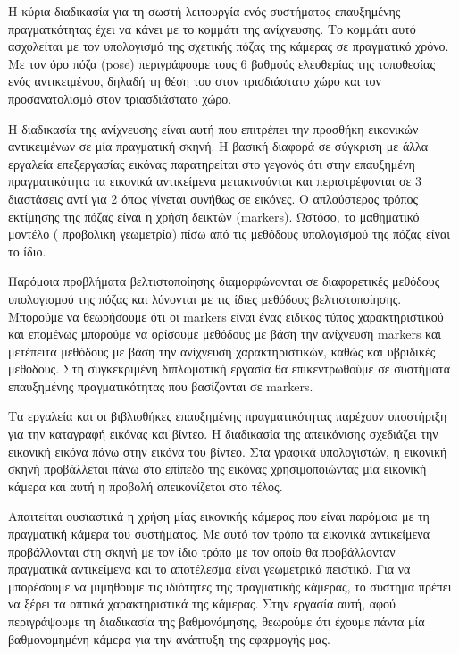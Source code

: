 Η κύρια διαδικασία για τη σωστή λειτουργία ενός συστήματος επαυξημένης πραγματκότητας έχει να κάνει με το κομμάτι της ανίχνευσης. Το κομμάτι αυτό ασχολείται με τον υπολογισμό της σχετικής πόζας της κάμερας σε πραγματικό χρόνο. Με τον όρο πόζα (pose) περιγράφουμε τους 6 βαθμούς ελευθερίας της τοποθεσίας ενός αντικειμένου, δηλαδή τη θέση του στον τρισδιάστατο χώρο και τον προσανατολισμό στον τριασδιάστατο χώρο.

Η διαδικασία της ανίχνευσης είναι αυτή που επιτρέπει την προσθήκη εικονικών αντικειμένων σε μία πραγματική σκηνή.
Η βασική διαφορά σε σύγκριση με άλλα εργαλεία επεξεργασίας εικόνας παρατηρείται στο γεγονός ότι στην επαυξημένη πραγματικότητα τα εικονικά αντικείμενα μετακινούνται και περιστρέφονται σε 3 διαστάσεις αντί για 2 όπως γίνεται συνήθως σε εικόνες.  Ο απλούστερος τρόπος εκτίμησης της πόζας είναι η χρήση δεικτών (markers). 
Ωστόσο, το μαθηματικό μοντέλο ( προβολική γεωμετρία) πίσω από τις μεθόδους υπολογισμού της πόζας είναι το ίδιο. 

Παρόμοια προβλήματα βελτιστοποίησης διαμορφώνονται σε διαφορετικές μεθόδους υπολογισμού της πόζας και λύνονται με τις ίδιες μεθόδους βελτιστοποίησης.  
Μπορούμε να θεωρήσουμε ότι οι markers είναι ένας ειδικός τύπος χαρακτηριστικού και επομένως μπορούμε να ορίσουμε μεθόδους με βάση την ανίχνευση markers και μετέπειτα μεθόδους με βάση την ανίχνευση χαρακτηριστικών, καθώς και υβριδικές μεθόδους. Στη συγκεκριμένη διπλωματική εργασία θα επικεντρωθούμε σε συστήματα επαυξημένης πραγματικότητας που βασίζονται σε markers.


Τα εργαλεία και οι βιβλιοθήκες επαυξημένης πραγματικότητας παρέχουν υποστήριξη για την καταγραφή εικόνας και βίντεο. Η διαδικασία της απεικόνισης σχεδιάζει την εικονική εικόνα πάνω στην εικόνα του βίντεο. Στα γραφικά υπολογιστών, η εικονική σκηνή προβάλλεται πάνω στο επίπεδο της εικόνας χρησιμοποιώντας μία εικονική κάμερα και αυτή η προβολή απεικονίζεται στο τέλος. 

Απαιτείται ουσιαστικά η χρήση μίας εικονικής κάμερας που είναι παρόμοια με τη πραγματική κάμερα του συστήματος. Με αυτό τον τρόπο τα εικονικά αντικείμενα προβάλλονται στη σκηνή με τον ίδιο τρόπο με τον οποίο θα προβάλλονταν πραγματικά αντικείμενα και το αποτέλεσμα είναι γεωμετρικά πειστικό. Για να μπορέσουμε να μιμηθούμε τις ιδιότητες της πραγματικής κάμερας, το σύστημα πρέπει να ξέρει τα οπτικά χαρακτηριστικά της κάμερας. Στην εργασία αυτή, αφού περιγράψουμε τη διαδικασία της βαθμονόμησης, θεωρούμε ότι έχουμε πάντα μία βαθμονομημένη κάμερα για την ανάπτυξη της εφαρμογής μας.



